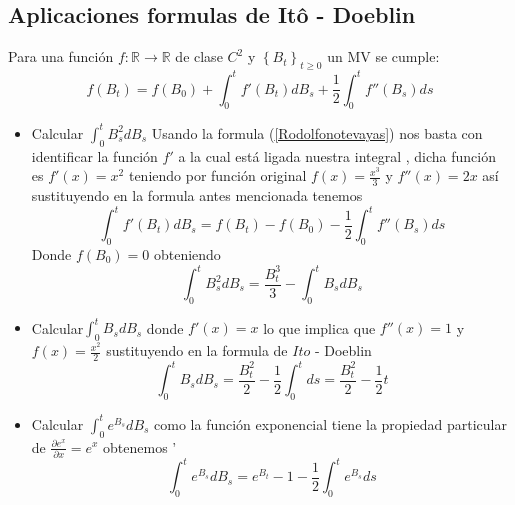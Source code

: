 \documentclass[11pt,notitlepage]{article}
\begin{document}
\subsection{Aplicaciones formulas de Itô - Doeblin}
Para una función \(f:\mathbb{R}\rightarrow \mathbb{R}\) de clase \(C^{2}\) y \(\left \{ B_{t} \right \}_{t\geq 0}\) un MV se cumple:
\begin{equation}\label{Rodolfonotevayas}
    f(B_{t})=f(B_{0})+\int_{0}^{t}f'(B_{t})dB_{s}+\frac{1}{2}\int_{0}^{t}f''(B_{s})ds
\end{equation}
\begin{itemize}
    \item Calcular \(\int_{0}^{t}B_{s}^{2}dB_{s}\)
    Usando la formula (\ref{Rodolfonotevayas}) nos basta con identificar la función \(f'\) a la cual está ligada nuestra integral , dicha función es \(f'(x)=x^{2}\) teniendo por función original \(f(x)=\frac{x^{3}}{3}\)  y \(f''(x)=2x\)  así sustituyendo en la formula antes mencionada tenemos 
    \begin{equation*}
         \int_{0}^{t}f'(B_{t})dB_{s} =f(B_{t})-f(B_{0})-\frac{1}{2}\int_{0}^{t}f''(B_{s})ds  
    \end{equation*}
    Donde \(f(B_{0})=0\) obteniendo
    \begin{equation*}
        \int_{0}^{t}B_{s}^{2}dB_{s}=\frac{B_{t}^{3}}{3}- \int_{0}^{t}B_{s}dB_{s}
    \end{equation*}
    \item Calcular\(\int_{0}^{t}B_{s}dB_{s}\)  donde \(f'(x)=x\) lo que implica que \(f''(x)=1\) y \(f(x)=\frac{x^{2}}{2}\) sustituyendo en la formula de \(Ito\) - Doeblin
    \begin{equation*}
        \int_{0}^{t}B_{s}dB_{s}=\frac{B_{t}^{2}}{2}- \frac{1}{2}\int_{0}^{t}ds=\frac{B_{t}^{2}}{2}- \frac{1}{2}t
    \end{equation*}
    \item Calcular \( \int_{0}^{t}e^{B_{s}}dB_{s}\) como la función exponencial tiene la propiedad particular de \(\frac{\partial e^{x}}{\partial x}=e^{x}\) obtenemos 
 '\begin{equation*}
     \int_{0}^{t}e^{B_{s}}dB_{s}=e^{B_{t}}-1-\frac{1}{2}\int_{0}^{t}e^{B_{s}}ds
 \end{equation*}
 
 \end{itemize}
\end{document}
